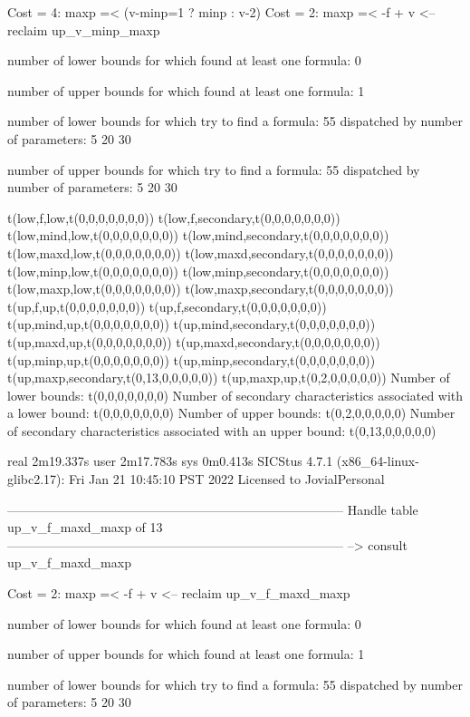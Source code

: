 Cost =  4:  maxp =< (v-minp=1 ? minp : v-2)
Cost =  2:  maxp =< -f + v
<-- reclaim up_v_minp_maxp

number of lower bounds for which found at least one formula: 0

number of upper bounds for which found at least one formula: 1

number of lower bounds for which try to find a formula: 55
dispatched by number of parameters: 5  20  30

number of upper bounds for which try to find a formula: 55
dispatched by number of parameters: 5  20  30

t(low,f,low,t(0,0,0,0,0,0,0))
t(low,f,secondary,t(0,0,0,0,0,0,0))
t(low,mind,low,t(0,0,0,0,0,0,0))
t(low,mind,secondary,t(0,0,0,0,0,0,0))
t(low,maxd,low,t(0,0,0,0,0,0,0))
t(low,maxd,secondary,t(0,0,0,0,0,0,0))
t(low,minp,low,t(0,0,0,0,0,0,0))
t(low,minp,secondary,t(0,0,0,0,0,0,0))
t(low,maxp,low,t(0,0,0,0,0,0,0))
t(low,maxp,secondary,t(0,0,0,0,0,0,0))
t(up,f,up,t(0,0,0,0,0,0,0))
t(up,f,secondary,t(0,0,0,0,0,0,0))
t(up,mind,up,t(0,0,0,0,0,0,0))
t(up,mind,secondary,t(0,0,0,0,0,0,0))
t(up,maxd,up,t(0,0,0,0,0,0,0))
t(up,maxd,secondary,t(0,0,0,0,0,0,0))
t(up,minp,up,t(0,0,0,0,0,0,0))
t(up,minp,secondary,t(0,0,0,0,0,0,0))
t(up,maxp,secondary,t(0,13,0,0,0,0,0))
t(up,maxp,up,t(0,2,0,0,0,0,0))
Number of lower bounds:                                             t(0,0,0,0,0,0,0)
Number of secondary characteristics associated with a lower bound:  t(0,0,0,0,0,0,0)
Number of upper bounds:                                             t(0,2,0,0,0,0,0)
Number of secondary characteristics associated with an upper bound: t(0,13,0,0,0,0,0)

real	2m19.337s
user	2m17.783s
sys	0m0.413s
SICStus 4.7.1 (x86_64-linux-glibc2.17): Fri Jan 21 10:45:10 PST 2022
Licensed to JovialPersonal


--------------------------------------------------------------------------------
Handle table up_v_f_maxd_maxp of 13
--------------------------------------------------------------------------------
--> consult up_v_f_maxd_maxp

Cost =  2:  maxp =< -f + v
<-- reclaim up_v_f_maxd_maxp

number of lower bounds for which found at least one formula: 0

number of upper bounds for which found at least one formula: 1

number of lower bounds for which try to find a formula: 55
dispatched by number of parameters: 5  20  30

